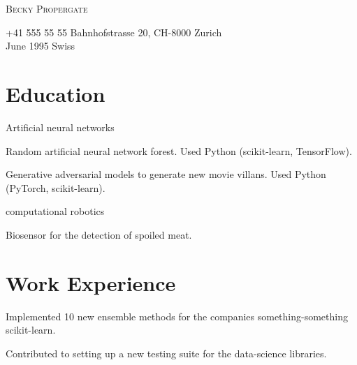 \documentclass[styling.tex]{subfiles}
\begin{document}
{
\Huge\textsc{Becky Propergate}
  \begin{flushleft}
    \scriptsize
      \faPhone\space+41 555 55 55
      \enspace\faEnvelope{}
      \enspace\faMapMarker\space Bahnhofstrasse 20, CH-8000 Zurich \\   
      \faBirthdayCake{} June 1995 
      \enspace\faFlag\space Swiss
      \enspace\faLinkedin{}
  \end{flushleft}
}

 \vspace{-0.7cm}

\section*{Education}
\begin{bullets}
      \item {} Artificial neural networks   
      \item {} Random artificial neural network forest. Used Python (scikit-learn, TensorFlow).
      \item {} Generative adversarial models to generate new movie villans. Used Python (PyTorch, scikit-learn).
\end{bullets}
  
\begin{bullets}
  \item {} computational robotics
  \item {} Biosensor for the detection of spoiled meat. 
\end{bullets}

\section*{Work Experience}
\begin{bullets}
  \item Implemented 10 new ensemble methods for the companies something-something scikit-learn.
  \item Contributed to setting up a new testing suite for the data-science libraries.
\end{bullets}
\end{document}
